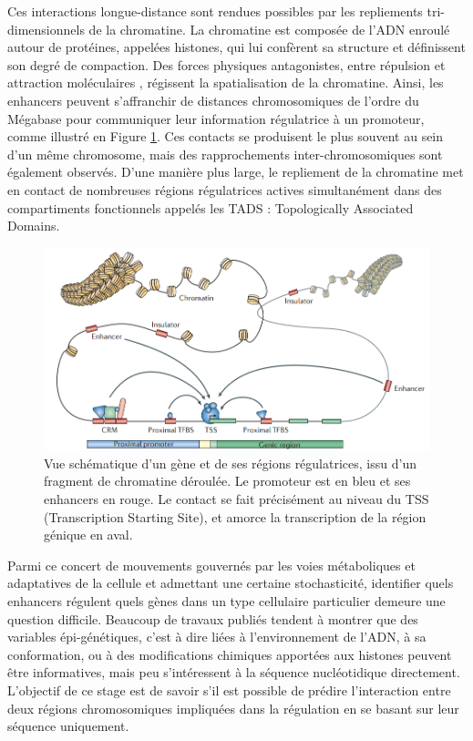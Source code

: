 \documentclass[french]{llncs}
\begin{document}
Ces interactions longue-distance sont rendues possibles par les repliements tri-dimensionnels de la chromatine. La chromatine est composée de l'ADN enroulé autour de protéines, appelées histones, qui lui confèrent sa structure et définissent son degré de compaction. Des forces physiques antagonistes, entre répulsion et attraction moléculaires \cite{robson_regulatory_2019}, régissent la spatialisation de la chromatine. Ainsi, les enhancers peuvent s'affranchir de distances chromosomiques de l'ordre du Mégabase pour communiquer leur information régulatrice à un promoteur, comme illustré en Figure \ref{fig/regulation}. Ces contacts se produisent le plus souvent au sein d'un même chromosome, mais des rapprochements inter-chromosomiques sont également observés. D'une manière plus large, le repliement de la chromatine met en contact de nombreuses régions régulatrices actives simultanément dans des compartiments fonctionnels appelés les TADS : Topologically Associated Domains.

\begin{figure}[h]
\begin{center}
 	\includegraphics[width=0.85\linewidth]{Images/regulation.png}
 \caption{Vue schématique d'un gène et de ses régions régulatrices, issu d'un fragment de chromatine déroulée. Le promoteur est en bleu et ses enhancers en rouge. Le contact se fait précisément au niveau du TSS (Transcription Starting Site), et amorce la transcription de la région génique en aval.\cite{lenhard_metazoan_2012}} \label{fig/regulation}
\end{center}
\end{figure}


Parmi ce concert de mouvements gouvernés par les voies métaboliques et adaptatives de la cellule et admettant une certaine stochasticité, identifier quels enhancers régulent quels gènes dans un type cellulaire particulier demeure une question difficile. Beaucoup de travaux publiés tendent à montrer que des variables épi-génétiques, c'est à dire liées à l'environnement de l'ADN, à sa conformation, ou à des modifications chimiques apportées aux histones peuvent être informatives, mais peu s'intéressent à la séquence nucléotidique directement. L'objectif de ce stage est de savoir s'il est possible de prédire l'interaction entre deux régions chromosomiques impliquées dans la régulation en se basant sur leur séquence uniquement.
\end{document}
